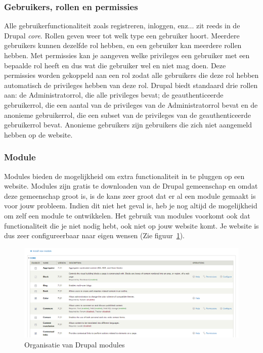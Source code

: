 \subsubsection{Gebruikers, rollen en permissies}
Alle gebruikerfunctionaliteit zoals registreren, inloggen, enz... zit reeds in de Drupal \textit{core}. Rollen geven weer tot welk type een gebruiker hoort. Meerdere gebruikers kunnen dezelfde rol hebben, en een gebruiker kan meerdere rollen hebben. Met permissies kan je aangeven welke privileges een gebruiker met een bepaalde rol heeft en dus wat die gebruiker wel en niet mag doen. Deze permissies worden gekoppeld aan een rol zodat alle gebruikers die deze rol hebben automatisch de privileges hebben van deze rol. Drupal biedt standaard drie rollen aan: de Administratorrol, die alle privileges bevat; de geauthenticeerde gebruikerrol, die een aantal van de privileges van de Administratorrol bevat en de anonieme gebruikerrol, die een subset van de privileges van de geauthenticeerde gebruikerrol bevat. Anonieme gebruikers zijn gebruikers die zich niet aangemeld hebben op de website.

\subsubsection{Module}
Modules bieden de mogelijkheid om extra functionaliteit in te pluggen op een website. Modules zijn gratis te downloaden van de Drupal gemeenschap en omdat deze gemeenschap groot is, is de kans zeer groot dat er al een module gemaakt is voor jouw probleem. Indien dit niet het geval is, heb je nog altijd de mogelijkheid om zelf een module te ontwikkelen. Het gebruik van modules voorkomt ook dat functionaliteit die je niet nodig hebt, ook niet op jouw website komt. Je website is dus zeer configureerbaar naar eigen wensen (Zie figuur~\ref{fig:drupalOrganizeModules}).
\begin{figure}[h]
\includegraphics[width=1\textwidth]{fig/drupalOrganizeModules}
\caption{Organisatie van Drupal modules}
\label{fig:drupalOrganizeModules}
\end{figure}

